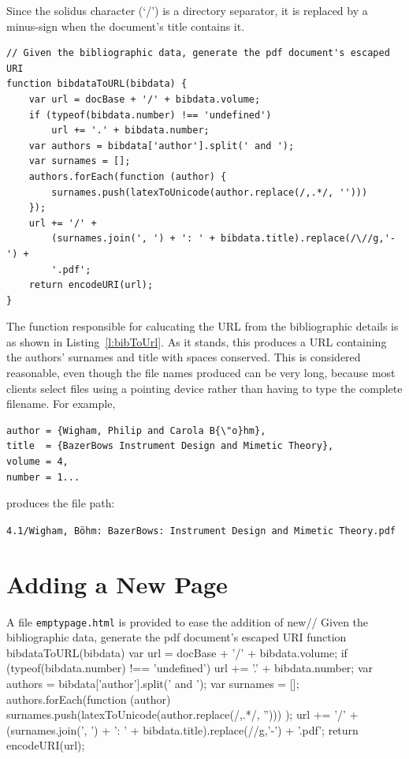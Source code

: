 \documentclass[a4paper,10pt]{SMR}
\begin{document}
Since the solidus character (`/') is a directory separator,
it is replaced by a minus-sign when the document's title contains it.

\begin{lstlisting}
// Given the bibliographic data, generate the pdf document's escaped URI
function bibdataToURL(bibdata) {
	var url = docBase + '/' + bibdata.volume;
	if (typeof(bibdata.number) !== 'undefined')
		url += '.' + bibdata.number;
	var authors = bibdata['author'].split(' and ');
	var surnames = [];
	authors.forEach(function (author) {
		surnames.push(latexToUnicode(author.replace(/,.*/, '')))
	});
	url += '/' + 
		(surnames.join(', ') + ': ' + bibdata.title).replace(/\//g,'-') +
		'.pdf';
	return encodeURI(url);
}
\end{lstlisting}

The function responsible for calucating the URL from the bibliographic
details is as shown in Listing~\ref{l:bibToUrl}. As it stands, this produces
a URL containing the authors' surnames and title with spaces conserved.
This is considered reasonable, even though the file names produced can be
very long, because most clients select files using a pointing device
rather than having to type the complete filename. For example,

\begin{verbatim}
author = {Wigham, Philip and Carola B{\"o}hm},
title  = {BazerBows Instrument Design and Mimetic Theory},
volume = 4,
number = 1...
\end{verbatim}

produces the file path:

\noindent
\verb!4.1/Wigham, Böhm: BazerBows: Instrument Design and Mimetic Theory.pdf!

\section{Adding a New Page}

A file \verb!emptypage.html! is provided to ease the addition of new// Given the bibliographic data, generate the pdf document's escaped URI
function bibdataToURL(bibdata) {
	var url = docBase + '/' + bibdata.volume;
	if (typeof(bibdata.number) !== 'undefined')
		url += '.' + bibdata.number;
	var authors = bibdata['author'].split(' and ');
	var surnames = [];
	authors.forEach(function (author) {
		surnames.push(latexToUnicode(author.replace(/,.*/, '')))
	});
	url += '/' + 
		(surnames.join(', ') + ': ' + bibdata.title).replace(/\//g,'-') +
		'.pdf';
	return encodeURI(url);
}
\end{document}
